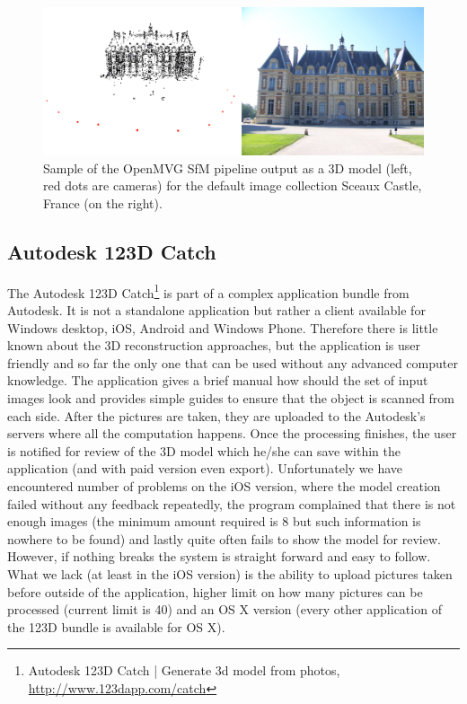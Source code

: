 \begin{figure}[ht]
	\begin{center}
		\includegraphics[keepaspectratio,width=\textwidth]{fig/openmvg.pdf}
	\end{center}
	\caption{Sample of the OpenMVG SfM pipeline output as a 3D model (left, red dots are cameras) for the default image collection Sceaux Castle, France (on the right).}
	\label{fig:openvmg}
\end{figure}

\subsection*{Autodesk 123D Catch}
The Autodesk 123D Catch\footnote{Autodesk 123D Catch | Generate 3d model from photos, \url{http://www.123dapp.com/catch}} is part of a complex application bundle from Autodesk. It is not a standalone application but rather a client available for Windows desktop, iOS, Android and Windows Phone. Therefore there is little known about the 3D reconstruction approaches, but the application is user friendly and so far the only one that can be used without any advanced computer knowledge. The application gives a brief manual how should the set of input images look and provides simple guides to ensure that the object is scanned from each side. After the pictures are taken, they are uploaded to the Autodesk's servers where all the computation happens. Once the processing finishes, the user is notified for review of the 3D model which he/she can save within the application (and with paid version even export). Unfortunately we have encountered number of problems on the iOS version, where the model creation failed without any feedback repeatedly, the program complained that there is not enough images (the minimum amount required is 8 but such information is nowhere to be found) and lastly quite often fails to show the model for review. However, if nothing breaks the system is straight forward and easy to follow. What we lack (at least in the iOS version) is the ability to upload pictures taken before outside of the application, higher limit on how many pictures can be processed (current limit is 40) and an OS X version (every other application of the 123D bundle is available for OS X).

